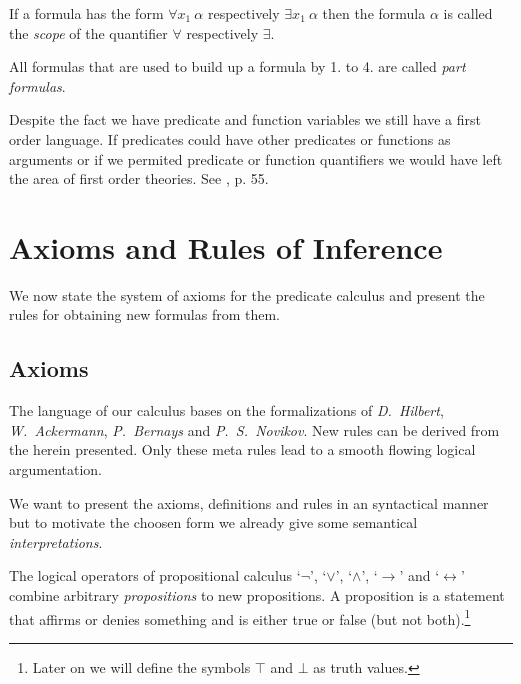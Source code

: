 \documentclass[a4paper,german,10pt,twoside]{book}
\theoremstyle{definition}
\theoremstyle{remark}
\begin{document}
\par
If a formula has the form $\forall x_1 ~ \alpha$ respectively $\exists x_1 ~ \alpha$ then the formula $\alpha$ is called the
\emph{scope} of the quantifier $\forall$ respectively $\exists$.

\par
All formulas that are used to build up a formula by 1. to 4. are called \emph{part formulas}. 

\par
Despite the fact we have predicate and function variables we still have a first order language. If predicates could have other predicates or functions as arguments or if we permited predicate or function quantifiers we would have left the area of first order theories. See \cite{mendelson}, p. 55.



\chapter{Axioms and Rules of Inference} \label{chapter5} \hypertarget{chapter5}{}

We now state the system of axioms for the predicate calculus and present the rules for obtaining new formulas from them.

\section{Axioms} \label{chapter5_section1} \hypertarget{chapter5_section1}{}
The language of our calculus bases on the formalizations of \emph{D.~Hilbert}, \emph{W.~Ackermann}\cite{hilback}, \emph{P.~Bernays} and \emph{P.~S.~Novikov}\cite{novikov}. New rules can be derived from the herein presented. Only these meta rules lead to a smooth flowing logical argumentation.
          
           \par
We want to present the axioms, definitions and rules in an syntactical manner but to motivate the choosen form we already give some semantical \emph{interpretations}.

\par
The logical operators of propositional calculus \mbox{`$\neg$'}, \mbox{`$\vee$'}, \mbox{`$\wedge$'}, \mbox{`$\rightarrow$'} and \mbox{`$\leftrightarrow$'} combine arbitrary \emph{propositions} to new propositions.
A proposition is a statement that affirms or denies something and is either {\glqq true\grqq} or {\glqq false\grqq} (but not both).\footnote{Later on we will define the symbols $\top$ and $\bot$ as truth values.}
\end{document}
